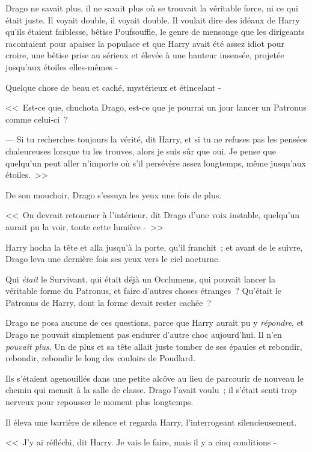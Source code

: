 Drago ne savait plus, il ne savait plus où se trouvait la véritable force, ni ce qui était juste. Il voyait double, il voyait double. Il voulait dire des idéaux de Harry qu'ils étaient faiblesse, bêtise Poufsouffle, le genre de mensonge que les dirigeants racontaient pour apaiser la populace et que Harry avait été assez idiot pour croire, une bêtise prise au sérieux et élevée à une hauteur insensée, projetée jusqu'aux étoiles elles-mêmes -

Quelque chose de beau et caché, mystérieux et étincelant -

<<~Est-ce que, chuchota Drago, est-ce que je pourrai un jour lancer un Patronus comme celui-ci~?

--- Si tu recherches toujours la vérité, dit Harry, et si tu ne refuses pas les pensées chaleureuses lorsque tu les trouves, alors je suis sûr que oui. Je pense que quelqu'un peut aller n'importe où s'il persévère assez longtemps, même jusqu'aux étoiles.~>>

De son mouchoir, Drago s'essuya les yeux une fois de plus.

<<~On devrait retourner à l'intérieur, dit Drago d'une voix instable, quelqu'un aurait pu la voir, toute cette lumière -~>>

Harry hocha la tête et alla jusqu'à la porte, qu'il franchit~; et avant de le suivre, Drago leva une dernière fois ses yeux vers le ciel nocturne.

Qui \emph{était} le Survivant, qui était déjà un Occlumens, qui pouvait lancer la véritable forme du Patronus, et faire d'autres choses étranges~? Qu'était le Patronus de Harry, dont la forme devait rester cachée~?

Drago ne posa aucune de ces questions, parce que Harry aurait pu y \emph{répondre}, et Drago ne pouvait simplement pas endurer d'autre choc aujourd'hui. Il n'en \emph{pouvait plus}. Un de plus et sa tête allait juste tomber de ses épaules et rebondir, rebondir, rebondir le long des couloirs de Poudlard.

\later

Ils s'étaient agenouillés dans une petite alcôve au lieu de parcourir de nouveau le chemin qui menait à la salle de classe. Drago l'avait voulu~; il s'était senti trop nerveux pour repousser le moment plus longtemps.

Il éleva une barrière de silence et regarda Harry, l'interrogeant silencieusement.

<<~J'y ai réfléchi, dit Harry. Je vais le faire, mais il y a cinq conditions -

